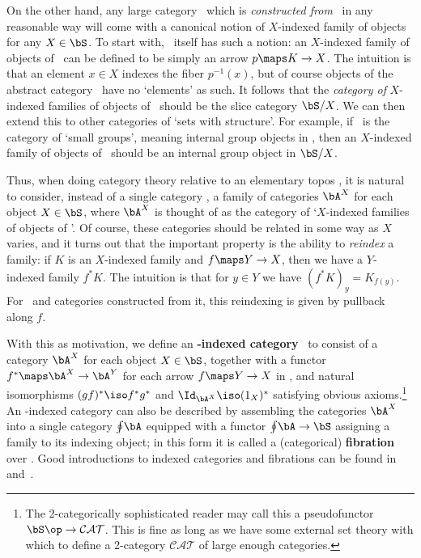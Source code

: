\documentclass{amsart}
\begin{document}
On the other hand, any large category \bA\ which is \emph{constructed
  from} \bS\ in any reasonable way will come with a canonical notion
of $X$-indexed family of objects for any $X\in\bS$.  To start with,
\bS\ itself has such a notion: an $X$-indexed family of objects of
\bS\ can be defined to be simply an arrow $p\maps K\to X$.  The
intuition is that an element $x\in X$ indexes the fiber $p^{-1}(x)$,
but of course objects of the abstract category \bS\ have no `elements'
as such.  It follows that the \emph{category of} $X$-indexed families
of objects of \bS\ should be the slice category $\bS/X$.  We can then
extend this to other categories of `sets with structure'.  For
example, if \bA\ is the category of `small groups', meaning internal
group objects in \bS, then an $X$-indexed family of objects of \bA\
should be an internal group object in $\bS/X$.

Thus, when doing category theory relative to an elementary topos \bS,
it is natural to consider, instead of a single category \bA, a family
of categories $\bA^X$ for each object $X\in\bS$, where $\bA^X$ is
thought of as the category of `$X$-indexed families of objects of
\bA'.  Of course, these categories should be related in some way as
$X$ varies, and it turns out that the important property is the
ability to \emph{reindex} a family: if $K$ is an $X$-indexed family
and $f\maps Y\to X$, then we have a $Y$-indexed family $f^*K$.  The
intuition is that for $y\in Y$ we have $(f^*K)_y=K_{f(y)}$.  For \bS\
and categories constructed from it, this reindexing is given by
pullback along $f$.

With this as motivation, we define an \textbf{\bS-indexed category}
\bA\ to consist of a category $\bA^X$ for each object $X\in\bS$,
together with a functor $f^*\maps \bA^X\to\bA^Y$ for each arrow
$f\maps Y\to X$ in \bS, and natural isomorphisms $(gf)^*\iso f^*g^*$
and $\Id_{\bA^X} \iso (1_X)^*$ satisfying obvious axioms.\footnote{The
  2-categorically sophisticated reader may call this a pseudofunctor
  $\bS\op\to\mathcal{CAT}$.  This is fine as long as we have some
  external set theory with which to define a 2-category
  $\mathcal{CAT}$ of large enough categories.}  An \bS-indexed
category can also be described by assembling the categories $\bA^X$
into a single category $\oint\!\bA$ equipped with a functor
$\oint\!\bA\to \bS$ assigning a family to its indexing object; in this
form it is called a (categorical) \textbf{fibration} over \bS.  Good
introductions to indexed categories and fibrations can be found
in~\cite[Part~B]{ptj:elephant} and~\cite{streicher:fibredcats}.
\end{document}

